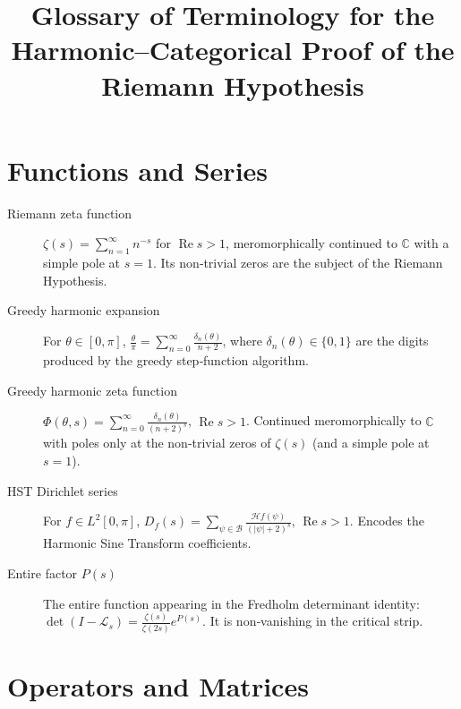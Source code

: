 \documentclass[11pt,a4paper]{article}
\title{\bfseries Glossary of Terminology for the Harmonic--Categorical Proof of the Riemann Hypothesis}
\author{}
\date{}
\begin{document}
\maketitle

\section*{Functions and Series}

\begin{description}
\item[Riemann zeta function] \(\zeta(s) = \sum_{n=1}^\infty n^{-s}\) for \(\operatorname{Re}s>1\), meromorphically continued to \(\mathbb{C}\) with a simple pole at \(s=1\). Its non‑trivial zeros are the subject of the Riemann Hypothesis. \cite{HSTpaper,RHproof}
\item[Greedy harmonic expansion] For \(\theta\in[0,\pi]\), \(\displaystyle \frac{\theta}{\pi} = \sum_{n=0}^\infty \frac{\delta_n(\theta)}{n+2}\), where \(\delta_n(\theta)\in\{0,1\}\) are the digits produced by the greedy step‑function algorithm. \cite{HSTpaper}
\item[Greedy harmonic zeta function] \(\displaystyle \Phi(\theta,s) = \sum_{n=0}^\infty \frac{\delta_n(\theta)}{(n+2)^s}\), \(\operatorname{Re}s>1\). Continued meromorphically to \(\mathbb{C}\) with poles only at the non‑trivial zeros of \(\zeta(s)\) (and a simple pole at \(s=1\)). \cite{HSTpaper}
\item[HST Dirichlet series] For \(f\in L^2[0,\pi]\), \(\displaystyle D_f(s) = \sum_{\psi\in\mathcal{B}} \frac{\mathcal{H}f(\psi)}{(|\psi|+2)^s}\), \(\operatorname{Re}s>1\). Encodes the Harmonic Sine Transform coefficients. \cite{HSTpaper}
\item[Entire factor \(P(s)\)] The entire function appearing in the Fredholm determinant identity: \(\det(I-\mathcal{L}_s) = \frac{\zeta(s)}{\zeta(2s)}e^{P(s)}\). It is non‑vanishing in the critical strip. \cite{DeterminantProof,RHproof}
\end{description}

\section*{Operators and Matrices}
\end{document}
